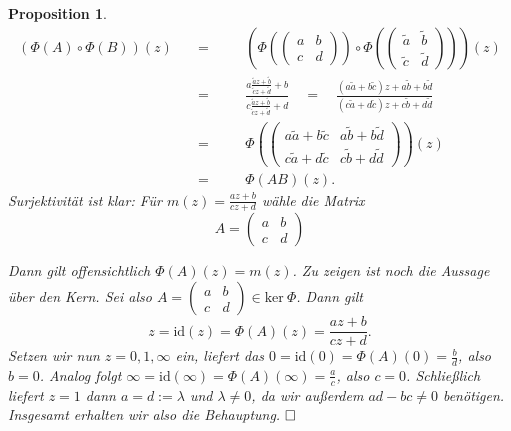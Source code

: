 \documentclass[11pt]{book}
\numberwithin{dummy}{section}
\newtheorem{proposition}[theorem]{Proposition}
\theoremstyle{nonumberbreak}
\newenvironment{pr}[1][]{\ifthenelse{\equal{#1}{}}{\proof}{\proof[#1]}\rm}{\endproof}
\newcommand{\kernel}{\mathrm{ker}\ }
\newcommand{\id}{\mathrm{id}}
\begin{document}
\begin{spacing}{1.4}
\begin{proposition}
\begin{pr}
\setlength{\abovedisplayskip}{5.5pt}
\setlength{\belowdisplayskip}{5.5pt}
\begin{alignat*}{5}
(\Phi(A) \circ \Phi(B) ) (z) \quad &=&& \quad \left(\Phi \left( \begin{pmatrix} a & b \\[-6pt] c & d \end{pmatrix} \right) \circ \Phi\left(\begin{pmatrix} \tilde{a} & \tilde{b} \\[-6pt] \tilde{c} & \tilde{d} \end{pmatrix}\right) \right)(z) \\[5pt]
&=&& \quad \frac{ a \frac{\tilde{a} z + \tilde{b}}{\tilde{c}z+\tilde{d}} + b}{c \frac{\tilde{a}z+\tilde{b}}{\tilde{c}z+\tilde{d}} + d } \quad = \quad  \frac{(a\tilde{a} + b \tilde{c})z + a\tilde{b} + b \tilde{d}}{(c\tilde{a} + d \tilde{c})z + c\tilde{b} + d \tilde{d}} \\[5pt]
&=&& \quad \Phi \left( \begin{pmatrix} a \tilde{a} + b \tilde{c} & a \tilde{b} + b \tilde{d} \\ c \tilde{a} + d \tilde{c} & c \tilde{b} + d \tilde{d} \end{pmatrix} \right) (z) \\[5pt]
&=&& \quad \Phi(AB)(z).
\end{alignat*}
Surjektivität ist klar: Für $m(z) = \frac{az+b}{cz+d}$ wähle die Matrix
$$A= \begin{pmatrix} a&b\\[-6pt] c&d\end{pmatrix}$$

Dann gilt offensichtlich $\Phi(A)(z) = m(z)$. Zu zeigen ist noch die Aussage über den Kern. Sei also $A= \begin{pmatrix} a&b \\[-6pt]c&d \end{pmatrix}\in \kernel \Phi$. Dann gilt 
$$z= \id(z) = \Phi(A)(z) = \frac{az+b}{cz+d}.$$
Setzen wir nun $z=0,1, \infty$ ein, liefert das $0 = \id(0) = \Phi(A)(0) = \frac{b}{d}$, also $b=0$. Analog folgt $\infty= \id(\infty) = \Phi(A)(\infty) =  \frac{a}{c}$, also $c=0$. Schließlich liefert $z=1$ dann $a=d:=\lambda$ und $\lambda \neq 0$, da wir außerdem $ad-bc \neq 0$ benötigen. Insgesamt erhalten wir also die Behauptung. $\hfill \Box$




\end{pr}

\end{proposition}





\end{spacing}
\end{document}
